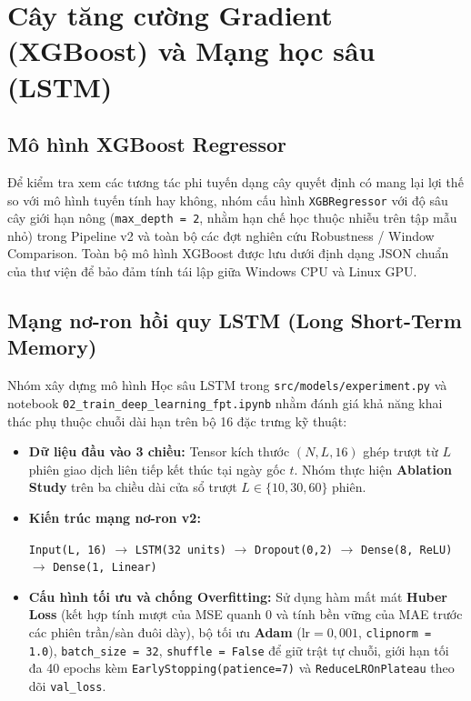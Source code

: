 \documentclass[12pt,a4paper]{report}
\begin{document}
\section{Cây tăng cường Gradient (XGBoost) và Mạng học sâu (LSTM)}

\subsection{Mô hình XGBoost Regressor}
Để kiểm tra xem các tương tác phi tuyến dạng cây quyết định có mang lại lợi thế so với mô hình tuyến tính hay không, nhóm cấu hình \texttt{XGBRegressor} \cite{chen2016xgboost} với độ sâu cây giới hạn nông (\texttt{max\_depth = 2}, nhằm hạn chế học thuộc nhiễu trên tập mẫu nhỏ) trong Pipeline v2 và toàn bộ các đợt nghiên cứu Robustness / Window Comparison. Toàn bộ mô hình XGBoost được lưu dưới định dạng JSON chuẩn của thư viện để bảo đảm tính tái lập giữa Windows CPU và Linux GPU.

\subsection{Mạng nơ-ron hồi quy LSTM (Long Short-Term Memory)}
Nhóm xây dựng mô hình Học sâu LSTM \cite{hochreiter1997lstm} trong \nolinkurl{src/models/experiment.py} và notebook \nolinkurl{02_train_deep_learning_fpt.ipynb} nhằm đánh giá khả năng khai thác phụ thuộc chuỗi dài hạn trên bộ 16 đặc trưng kỹ thuật:
\begin{itemize}
    \item \textbf{Dữ liệu đầu vào 3 chiều:} Tensor kích thước $(N, L, 16)$ ghép trượt từ $L$ phiên giao dịch liên tiếp kết thúc tại ngày gốc $t$. Nhóm thực hiện \textbf{Ablation Study} trên ba chiều dài cửa sổ trượt $L \in \{10, 30, 60\}$ phiên.
    \item \textbf{Kiến trúc mạng nơ-ron v2:}
    \begin{center}
        \texttt{Input(L, 16)} $\longrightarrow$ \texttt{LSTM(32 units)} $\longrightarrow$ \texttt{Dropout(0,2)} $\longrightarrow$ \texttt{Dense(8, ReLU)} $\longrightarrow$ \texttt{Dense(1, Linear)}
    \end{center}
    \item \textbf{Cấu hình tối ưu và chống Overfitting:} Sử dụng hàm mất mát \textbf{Huber Loss} \cite{huber1964robust} (kết hợp tính mượt của MSE quanh 0 và tính bền vững của MAE trước các phiên trần/sàn đuôi dày), bộ tối ưu \textbf{Adam} ($\text{lr} = 0,001$, \texttt{clipnorm = 1.0}), \texttt{batch\_size = 32}, \texttt{shuffle = False} để giữ trật tự chuỗi, giới hạn tối đa 40 epochs kèm \texttt{EarlyStopping(patience=7)} và \texttt{ReduceLROnPlateau} theo dõi \texttt{val\_loss}.
\end{itemize}
\end{document}
